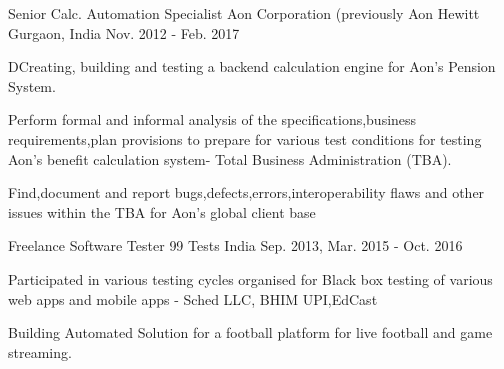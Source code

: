 \begin{cventries}
  \cventry
    {Senior Calc. Automation Specialist} %
    {Aon Corporation (previously Aon Hewitt} %
    {Gurgaon, India} %
    {Nov. 2012 - Feb. 2017} %
    {
      \begin{cvitems} %
        \item {DCreating, building and testing a backend calculation engine for Aon’s Pension System.}
        \item {Perform formal and informal analysis of the specifications,business requirements,plan provisions to prepare for various test conditions for
testing Aon’s benefit calculation system- Total Business Administration (TBA).}
        \item{Find,document and report bugs,defects,errors,interoperability flaws and other issues within the TBA for Aon’s global client base}
      \end{cvitems}
    }

  \cventry
    {Freelance Software Tester} %
    {99 Tests} %
    {India} %
    {Sep. 2013, Mar. 2015 - Oct. 2016} %
    {
      \begin{cvitems} %
        \item {Participated in various testing cycles organised for Black box testing of various web apps and mobile apps - Sched LLC, BHIM UPI,EdCast }
        \item {Building Automated Solution for a football platform for live football and game streaming.}
      \end{cvitems}
    }

\end{cventries}
